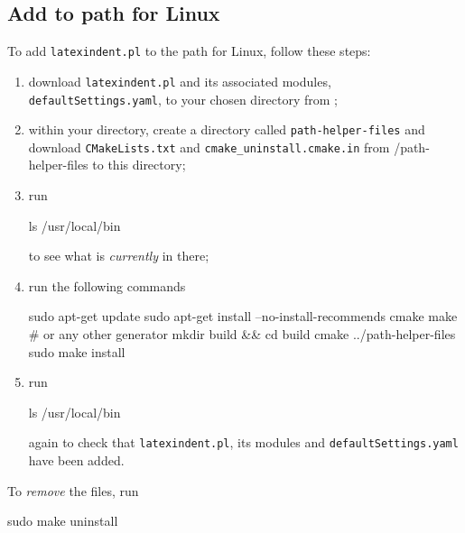  \subsection{Add to path for Linux}
  To add \texttt{latexindent.pl} to the path for Linux, follow these steps:
  \begin{enumerate}
   \item download \texttt{latexindent.pl} and its associated modules,
         \texttt{defaultSettings.yaml}, to your chosen directory from
         \cite{latexindent-home} ;
   \item within your directory, create a directory called \texttt{path-helper-files} and
         download \texttt{CMakeLists.txt} and \lstinline!cmake_uninstall.cmake.in! from
         \cite{latexindent-home}/path-helper-files to this directory;
   \item run

         \begin{commandshell}
ls /usr/local/bin
\end{commandshell}

         to see what is \emph{currently} in there;
   \item run the following commands

         \begin{commandshell}
sudo apt-get update
sudo apt-get install --no-install-recommends cmake make # or any other generator
mkdir build && cd build
cmake ../path-helper-files
sudo make install
\end{commandshell}

   \item run

         \begin{commandshell}
ls /usr/local/bin
\end{commandshell}

         again to check that \texttt{latexindent.pl}, its modules and
         \texttt{defaultSettings.yaml} have been added.
  \end{enumerate}
  To \emph{remove} the files, run

  \begin{commandshell}
sudo make uninstall
\end{commandshell}

